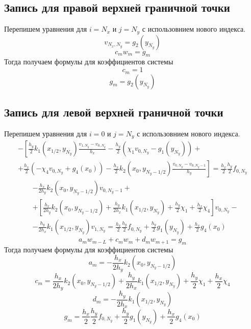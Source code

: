\subsection{Запись для правой верхней граничной точки}
Перепишем уравнения для $i = N_x$ и $j = N_y$ с использовнием нового индекса.
\[ v_{N_x,N_y} = g_2(y_{N_y}) \]
\[ c_m w_m = g_m \]
Тогда получаем формулы для коэффициентов системы
\[ c_m = 1 \]
\[ g_m = g_2(y_{N_y}) \]

\subsection{Запись для левой верхней граничной точки}
Перепишем уравнения для $i = 0$ и $j = N_y$ с использовнием нового индекса.
\begin{multline*}
  - \left[
  \frac{h_y}{2} k_1(x_{1/2},y_{N_y}) \frac{v_{1,N_y} - v_{0,N_y}}{h_x} - \frac{h_y}{2} \left( \chi_1 v_{0,N_y} - g_1(y_{N_y}) \right) + \right. \\
  \left. +
  \frac{h_x}{2} \left( - \chi_4 v_{0,N_y} + g_4(x_0) \right) - \frac{h_x}{2} k_2(x_{0},y_{N_y-1/2}) \frac{v_{0,N_y} - v_{0,N_y-1}}{h_y}
  \right] =
  \frac{h_x}{2} \frac{h_y}{2} f_{0,N_y}
\end{multline*}
\[
\begin{split}
    &-\frac{h_x}{2 h_y} k_2(x_{0},y_{N_y-1/2}) v_{0,N_y-1} +\\
    &+\left[ \frac{h_x}{2 h_y} k_2(x_{0},y_{N_y-1/2}) + \frac{h_y}{2 h_x} k_1(x_{1/2},y_{N_y}) + \frac{h_y}{2} \chi_1 + \frac{h_x}{2} \chi_4 \right] v_{0,N_y} - \\
    &-\frac{h_y}{2 h_x} k_1(x_{1/2},y_{N_y}) v_{1,N_y} = \frac{h_x}{2} \frac{h_y}{2} f_{0,N_y} + \frac{h_y}{2} g_1(y_{N_y}) + \frac{h_x}{2} g_4(x_0)
\end{split}
\]
\[ a_m w_{m - L} + c_m w_m + d_m w_{m + 1} = g_m \]
Тогда получаем формулы для коэффициентов системы
\[ a_m = -\frac{h_x}{2 h_y} k_2(x_{0},y_{N_y-1/2}) \]
\[ c_m = \frac{h_x}{2 h_y} k_2(x_{0},y_{N_y-1/2}) + \frac{h_y}{2 h_x} k_1(x_{1/2},y_{N_y}) + \frac{h_y}{2} \chi_1 + \frac{h_x}{2} \chi_4 \]
\[ d_m = -\frac{h_y}{2 h_x} k_1(x_{1/2},y_{N_y}) \]
\[ g_m = \frac{h_x}{2} \frac{h_y}{2} f_{0,N_y} + \frac{h_y}{2} g_1(y_{N_y}) + \frac{h_x}{2} g_4(x_0) \]

